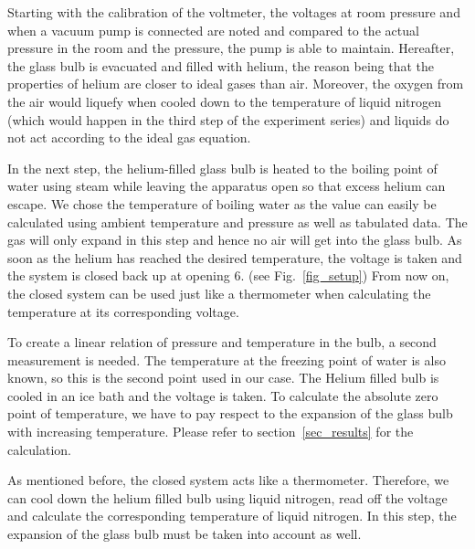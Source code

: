     Starting with the calibration of the voltmeter, the voltages at room pressure and when a vacuum pump is connected are noted and compared to the actual pressure in the room and the pressure, the pump is able to maintain.
    Hereafter, the glass bulb is evacuated and filled with helium, the reason being that the properties of helium are closer to ideal gases than air.
    Moreover, the oxygen from the air would liquefy when cooled down to the temperature of liquid nitrogen (which would happen in the third step of the experiment series) and liquids do not act according to the ideal gas equation.

    In the next step, the helium-filled glass bulb is heated to the boiling point of water using steam while leaving the apparatus open so that excess helium can escape.
    We chose the temperature of boiling water as the value can easily be calculated using ambient temperature and pressure as well as tabulated data.
    The gas will only expand in this step and hence no air will get into the glass bulb.
    As soon as the helium has reached the desired temperature, the voltage is taken and the system is closed back up at opening 6. (see Fig.~\ref{fig_setup})
    From now on, the closed system can be used just like a thermometer when calculating the temperature at its corresponding voltage.
    
    To create a linear relation of pressure and temperature in the bulb, a second measurement is needed.
    The temperature at the freezing point of water is also known, so this is the second point used in our case.
    The Helium filled bulb is cooled in an ice bath and the voltage is taken.
    To calculate the absolute zero point of temperature, we have to pay respect to the expansion of the glass bulb with increasing temperature.
    Please refer to section~\ref{sec_results} for the calculation.

    As mentioned before, the closed system acts like a thermometer.
    Therefore, we can cool down the helium filled bulb using liquid nitrogen, read off the voltage and calculate the corresponding temperature of liquid nitrogen.
    In this step, the expansion of the glass bulb must be taken into account as well.

